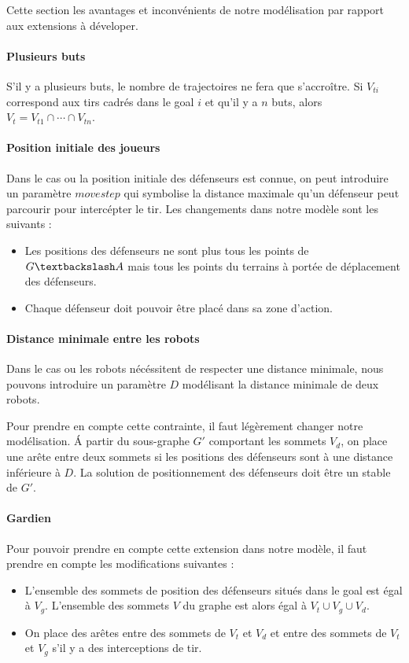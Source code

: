 \documentclass[12pt]{article}
\begin{document}
Cette section les avantages et inconvénients de notre modélisation par rapport aux extensions à déveloper.

\paragraph{Plusieurs buts}
S'il y a plusieurs buts, le nombre de trajectoires ne fera que s'accroître. Si $V_{ti}$ correspond aux tirs cadrés dans le goal $i$ et qu'il y a $n$ buts, alors $V_t = V_{t1} \cap \cdots \cap V_{tn}$.


\paragraph{Position initiale des joueurs}
Dans le cas ou la position initiale des défenseurs est connue, on peut introduire un paramètre $movestep$ qui symbolise la distance maximale qu'un défenseur peut parcourir pour intercépter le tir. Les changements dans notre modèle sont les suivants :

\begin{itemize}
  \item Les positions des défenseurs ne sont plus tous les points de $G \textbackslash A$ mais tous les points du terrains à portée de déplacement des défenseurs.
  \item Chaque défenseur doit pouvoir être placé dans sa zone d'action.
\end{itemize}

\paragraph{Distance minimale entre les robots}
Dans le cas ou les robots nécéssitent de respecter une distance minimale, nous pouvons introduire un paramètre $D$ modélisant la distance minimale de deux robots.

Pour prendre en compte cette contrainte, il faut légèrement changer notre modélisation. \'A partir du sous-graphe $G'$ comportant les sommets $V_d$, on place une arête entre deux sommets si les positions des défenseurs sont à une distance inférieure à $D$. La solution de positionnement des défenseurs doit être un stable de $G'$.



\paragraph{Gardien}
Pour pouvoir prendre en compte cette extension dans notre modèle, il faut prendre en compte les modifications suivantes :
\begin{itemize}
  \item L'ensemble des sommets de position des défenseurs situés dans le goal est égal à $V_g$. L'ensemble des sommets $V$ du graphe est alors égal à $V_t \cup V_g \cup V_d$.
  \item On place des arêtes entre des sommets de $V_t$ et $V_d$ et entre des sommets de $V_t$ et $V_g$ s'il y a des interceptions de tir.
\end{itemize}
\end{document}
